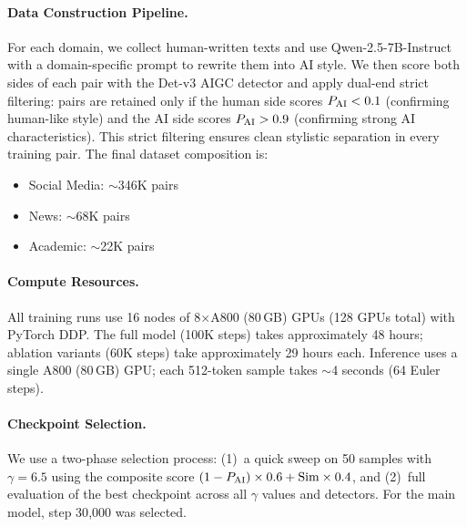 \paragraph{Data Construction Pipeline.}
For each domain, we collect human-written texts and use Qwen-2.5-7B-Instruct with a domain-specific prompt to rewrite them into AI style.
We then score both sides of each pair with the Det-v3 AIGC detector and apply dual-end strict filtering: pairs are retained only if the human side scores $P_{\text{AI}} < 0.1$ (confirming human-like style) and the AI side scores $P_{\text{AI}} > 0.9$ (confirming strong AI characteristics).
This strict filtering ensures clean stylistic separation in every training pair.
The final dataset composition is:
\begin{itemize}
    \item Social Media: ${\sim}$346K pairs
    \item News: ${\sim}$68K pairs
    \item Academic: ${\sim}$22K pairs
\end{itemize}

\paragraph{Compute Resources.}
All training runs use 16 nodes of 8$\times$A800 (80\,GB) GPUs (128 GPUs total) with PyTorch DDP.
The full model (100K steps) takes approximately 48 hours; ablation variants (60K steps) take approximately 29 hours each.
Inference uses a single A800 (80\,GB) GPU; each 512-token sample takes ${\sim}$4 seconds (64 Euler steps).

\paragraph{Checkpoint Selection.}
We use a two-phase selection process: (1)~a quick sweep on 50 samples with $\gamma{=}6.5$ using the composite score $(1 - P_{\text{AI}}) \times 0.6 + \text{Sim} \times 0.4$, and (2)~full evaluation of the best checkpoint across all $\gamma$ values and detectors.
For the main model, step 30{,}000 was selected.
